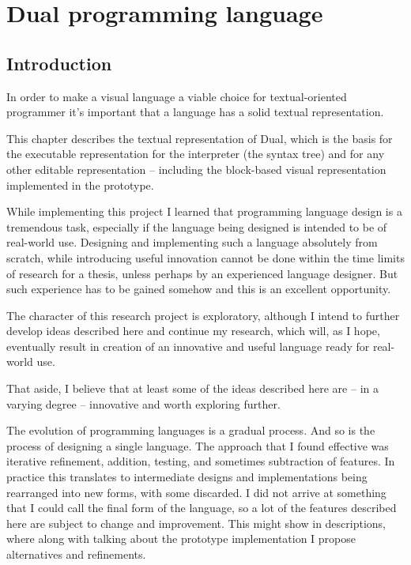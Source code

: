 \chapter{Dual programming language}\label{chap:lang}

\section{Introduction}
In order to make a visual language a viable choice for textual-oriented programmer it's important that a language has a solid textual representation.

This chapter describes the textual representation of Dual, which is the basis for the executable representation for the interpreter (the syntax tree) and for any other editable representation -- including the block-based visual representation implemented in the prototype.

While implementing this project I learned that programming language design is a tremendous task, especially if the language being designed is intended to be of real-world use. Designing and implementing such a language absolutely from scratch, while introducing useful innovation cannot be done within the time limits of research for a thesis, unless perhaps by an experienced language designer. But such experience has to be gained somehow and this is an excellent opportunity.

The character of this research project is exploratory, although I intend to further develop ideas described here and continue my research, which will, as I hope, eventually result in creation of an innovative and useful language ready for real-world use.

That aside, I believe that at least some of the ideas described here are -- in a varying degree -- innovative and worth exploring further.

The evolution of programming languages is a gradual process. And so is the process of designing a single language. The approach that I found effective was iterative refinement, addition, testing, and sometimes subtraction of features. In practice this translates to intermediate designs and implementations being rearranged into new forms, with some discarded. I did not arrive at something that I could call the final form of the language, so a lot of the features described here are subject to change and improvement. This might show in descriptions, where along with talking about the prototype implementation I propose alternatives and refinements.

